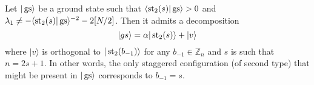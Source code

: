 \begin{lemma}\label{l:gs_dec}
Let $|\operatorname{gs}\rangle$ be a ground state such that $\langle \operatorname{st}_2(s)|\operatorname{gs} \rangle > 0$ and $\lambda_1 \neq -\langle \operatorname{st}_2(s) | \operatorname{gs}\rangle^{-2} - 2[N/2]$. Then it admits a decomposition
\[
|gs\rangle = \alpha |\operatorname{st}_2(s) \rangle + | v\rangle
\]
where $|v\rangle$ is orthogonal to $|\operatorname{st}_2(b_{-1})\rangle$ for any $b_{-1} \in \mathbb Z_n$ and $s$ is such that $n = 2s + 1$. In other words, the only staggered configuration (of second type) that might be present in $|\operatorname{gs}\rangle$ corresponds to $b_{-1} = s$. 
\end{lemma}
